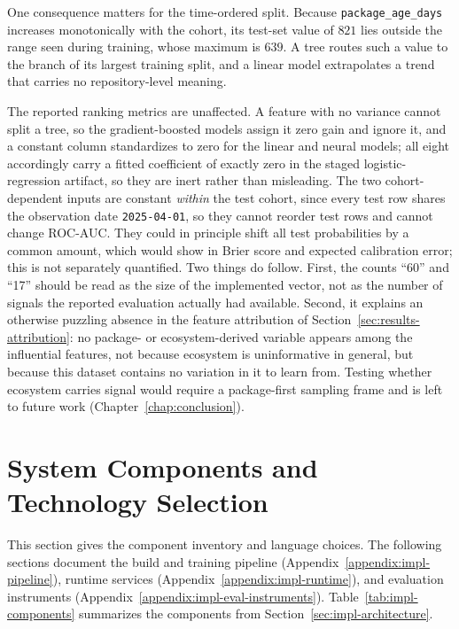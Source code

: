 One consequence matters for the time-ordered split. Because \texttt{package\_age\_days} increases monotonically with the cohort, its test-set value of \(821\) lies outside the range seen during training, whose maximum is \(639\). A tree routes such a value to the branch of its largest training split, and a linear model extrapolates a trend that carries no repository-level meaning.

The reported ranking metrics are unaffected. A feature with no variance cannot split a tree, so the gradient-boosted models assign it zero gain and ignore it, and a constant column standardizes to zero for the linear and neural models; all eight accordingly carry a fitted coefficient of exactly zero in the staged logistic-regression artifact, so they are inert rather than misleading. The two cohort-dependent inputs are constant \emph{within} the test cohort, since every test row shares the observation date \texttt{2025-04-01}, so they cannot reorder test rows and cannot change ROC-AUC. They could in principle shift all test probabilities by a common amount, which would show in Brier score and expected calibration error; this is not separately quantified. Two things do follow. First, the counts ``60'' and ``17'' should be read as the size of the implemented vector, not as the number of signals the reported evaluation actually had available. Second, it explains an otherwise puzzling absence in the feature attribution of Section~\ref{sec:results-attribution}: no package- or ecosystem-derived variable appears among the influential features, not because ecosystem is uninformative in general, but because this dataset contains no variation in it to learn from. Testing whether ecosystem carries signal would require a package-first sampling frame and is left to future work (Chapter~\ref{chap:conclusion}).

\section{System Components and Technology Selection}
\label{appendix:impl-detail}

This section gives the component inventory and language choices. The following
sections document the build and training pipeline
(Appendix~\ref{appendix:impl-pipeline}), runtime services
(Appendix~\ref{appendix:impl-runtime}), and evaluation instruments
(Appendix~\ref{appendix:impl-eval-instruments}). Table~\ref{tab:impl-components}
summarizes the components from Section~\ref{sec:impl-architecture}.

